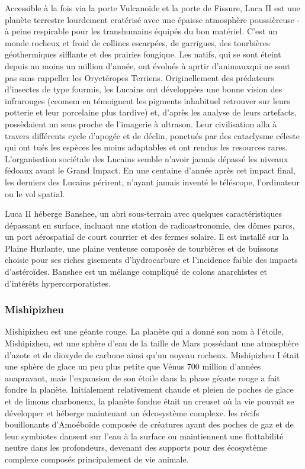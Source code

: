                                                                      Accessible à la fois via la porte Vulcanoïde et la porte de Fissure, Luca II est une planète terrestre lourdement cratérisé avec une épaisse atmosphère poussièreuse - à peine respirable pour les transhumains équipés du bon matériel. C'est un monde rocheux et froid de collines escarpées, de garrigues, des tourbières géothermiques sifflante et des prairies fongique. Les natifs, qui se sont éteint depuis au moins un million d'année, ont évolués à aprtir d'animauxqui ne sont pas sans rappeller les Oryctéropes Terriens. Originellement des prédateurs d'insectes de type fourmis, les Lucains ont développées une bonne vision des infrarouges (ceomem en témoignent les pigments inhabituel retrouver sur leurs potterie et leur porcelaine plus tardive) et, d'après les analyse de leurs artefacts, possèdaient un sens proche de l'imagerie à ultrason. Leur civilisation alla à travers différents cycle d'apogée et de déclin, ponctués par des cataclysme céleste qui ont tués les espèces les moins adaptables et ont rendus les resources rares. L'organisation sociétale des Lucains semble n'avoir jamais dépassé les niveaux fédoaux avant le Grand Impact. En une centaine d'année après cet impact final, les derniers des Lucains périrent, n'ayant jamais inventé le téléscope, l'ordinateur ou le vol spatial. 

                                                                     Luca II héberge Banshee, un abri sous-terrain avec quelques caractéristiques dépassant en surface, incluant une station de radioastronomie, des dômes parcs, un port aérospatial de court courrier et des fermes solaire. Il est installé sur la Plaine Hurlante, une plaine venteuse composée de tourbières et de buissons choisie pour ses riches gisements d'hydrocarbure et l'incidence faible des impacts d'astéroïdes. Banshee est un mélange compliqué de colons anarchistes et d'intérêts hypercorporatistes. 

                                                                     \subsubsection{Mishipizheu} \label{sec:mishipizheu} 

                                                                     Mishipizheu est une géante rouge. La planète qui a donné son nom à l'étoile, Mishipizheu, est une sphère d'eau de la taille de Mars possédant une atmosphère d'azote et de dioxyde de carbone ainsi qu'un noyeau rocheux. Mishipizheu I était une sphère de glace un peu plus petite que Vénus 700 million d'années auapravant, mais l'expansion de son étoile dans la phase géante rouge a fait fondre la planète. Initialement relativement chaude et pleien de poches de glace et de limons charboneux, la planète fondue était un creuset où la vie pouvait se développer et héberge maintenant un édcosystème complexe. les récifs bouillonants d'Amoéboïde composée de créatures ayant des poches de gaz et de leur symbiotes dansent sur l'eau à la surface ou maintiennent une flottabilité neutre dans les profondeurs, devenant des supports pour des écosystème complexe composés principalement de vie animale. 

